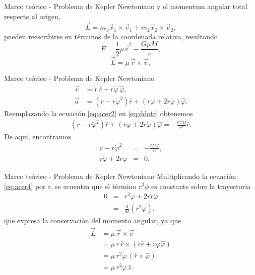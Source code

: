 \begin{frame}{Marco teórico - Problema de Kepler Newtoniano}
    y el momentum angular total respecto al origen,
\begin{equation}
    \vec{L}=m_1\vec{x}_1\times\vec{v}_1+m_2\vec{x}_2\times\vec{v}_2,
\end{equation}
    pueden reescribirse en términos de la coordenada relativa, resultando
\begin{equation}\label{eq:Er}
    E=\frac{1}{2}\mu \vec{v}^2-\frac{G\mu M}{r},
\end{equation}
\begin{equation}\label{eq:Lr}
    \vec{L}=\mu\,\vec{r}\times\vec{v},
\end{equation}
\end{frame}
\begin{frame}{Marco teórico - Problema de Kepler Newtoniano}
    \begin{align}
        \vec{v} & = \dot{r}\,\hat{r}+r\dot{\varphi}\,\hat{\varphi} ,\label{eq:vel1}\\
        \vec{a} & = \left(\ddot{r}-r\dot{\varphi}^2\right)\hat{r} +\left(r\ddot{\varphi}+2\dot{r}\dot{\varphi}\right)\hat{\varphi} .\label{eq:acer2}
    \end{align}
    Reemplazando la ecuación \ref{eq:acer2} en \ref{eq:ddotr} obtenemos
    \begin{eqnarray}
        \left(\ddot{r}-r\dot{\varphi}^2\right)\hat{r}+
        \left(r\ddot{\varphi}+2\dot{r}\dot{\varphi}\right)\hat{\varphi}
        =-\frac{GM}{r^2}\hat{r}.
    \end{eqnarray}
    De aqui, encontramos 
    \begin{eqnarray}
        \ddot{r}-r\dot{\varphi}^2&=&-\frac{GM}{r^2},\label{eq:acer3}\\
        r\ddot{\varphi}+2\dot{r}\dot{\varphi}&=&0.\label{eq:acer4}
    \end{eqnarray}
\end{frame}
\begin{frame}{Marco teórico - Problema de Kepler Newtoniano}
Multiplicando la ecuación \ref{eq:acer4} por r, se ecuentra que el término $r^2\phi$ es constante sobre la trayectoria
    \begin{eqnarray*}
        0&=&r^2\ddot{\varphi}+2r\dot{r}\dot{\varphi}\\
        &=&\frac{d}{dt}\left(r^2\dot{\varphi}\right),
    \end{eqnarray*}
    que expresa la conservación del momento angular, ya que
\begin{align*}
    \vec{L} & = \mu\,\vec{r}\times\vec{v}\\
    & = \mu\,r\,\hat{r}\times\left(\dot{r}\hat{r}+r\dot{\varphi}\hat{\varphi}
    \right)\\
    & = \mu\,r^2\dot{\varphi}\,(\hat{r}\times\hat{\varphi})\\
    & = \mu\,r^2\dot{\varphi}\,\hat{z}.
    \end{align*}
\end{frame}
